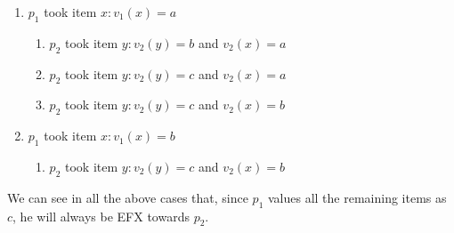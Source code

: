 \documentclass{article}
\begin{document}
\begin{enumerate}
    \item $p_1$ took item $x: v_1(x) = a$
    \begin{enumerate}
        \item $p_2$ took item $y:v_2(y) = b$ and $v_2(x) = a$ \label{enumerate:non-problematic-assigment-case-aba}
        \item $p_2$ took item $y: v_2(y) = c$ and $v_2(x) = a$ \label{enumerate:non-problematic-assigment-case-aca}
        \item $p_2$ took item $y: v_2(y) = c$ and $v_2(x) = b$ \label{enumerate:non-problematic-assigment-case-acb}
    \end{enumerate}
    \item $p_1$ took item $x: v_1(x) = b$
    \begin{enumerate}
        \item $p_2$ took item $y: v_2(y) = c$ and $v_2(x) = b$
        \label{enumerate:non-problematic-assigment-case-bcb}
    \end{enumerate}
\end{enumerate}
We can see in all the above cases that, since $p_1$ values all the remaining items as $c$, he will always be EFX towards $p_2$.
\end{document}
